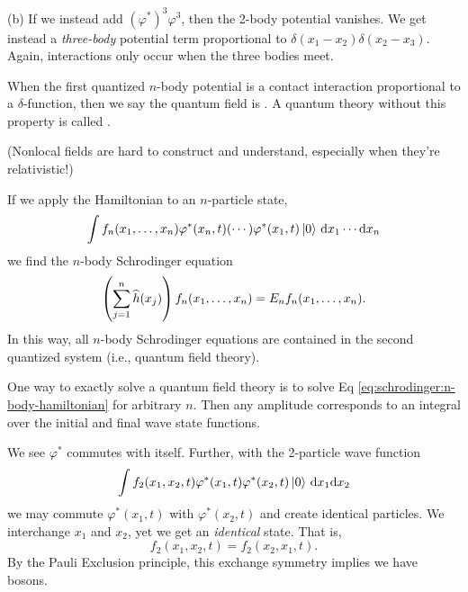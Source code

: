 (b) If we instead add $(\varphi^{*})^{3}\varphi^{3}$, then the 2-body
potential vanishes. We get instead a \emph{three-body} potential term
proportional to $\delta(x_{1}-x_{2})\delta(x_{2}-x_{3})$. Again,
interactions only occur when the three bodies meet.

\begin{definition}
When the first quantized $n$-body potential is a contact
interaction proportional to a $\delta$-function, then we say the quantum
field is . A quantum theory without this property is
called .

(Nonlocal fields are hard to construct and understand, especially when
they're relativistic!)
\end{definition}

If we apply the Hamiltonian to an $n$-particle state,
\begin{equation}
\int f_{n}(x_{1},\dots,x_{n})\varphi^{*}(x_{n},t)(\cdots)\varphi^{*}(x_{1},t)\ket{0}\,\mathrm{d}{x}_{1}
\cdots\mathrm{d}{x}_{n}
\end{equation}
we find the $n$-body Schrodinger equation
\begin{equation}\label{eq:schrodinger:n-body-hamiltonian}
\left(\sum^{n}_{j=1}\widehat{h}(x_{j})\right)f_{n}(x_{1},\dots,x_{n})=E_{n}f_{n}(x_{1},\dots,x_{n}).
\end{equation}
In this way, all $n$-body Schrodinger equations are contained in the
second quantized system (i.e., quantum field theory).

One way to exactly solve a quantum field theory is to solve Eq
\eqref{eq:schrodinger:n-body-hamiltonian} for arbitrary $n$. Then any
amplitude corresponds to an integral over the initial and final wave
state functions. 


We see $\varphi^{*}$ commutes with itself. Further, with the 2-particle
wave function 
\begin{equation*}
\int f_{2}(x_{1}, x_{2}, t)\varphi^{*}(x_{1},t)\varphi^{*}(x_{2},t)\ket{0}\,\mathrm{d}{x_{1}}\mathrm{d}{x_{2}}
\end{equation*}
we may commute $\varphi^{*}(x_{1},t)$ with $\varphi^{*}(x_{2},t)$ and
create identical particles. We interchange $x_{1}$ and $x_{2}$, yet we
get an \emph{identical} state. That is,
\begin{equation}
f_{2}(x_{1},x_{2},t) = f_{2}(x_{2},x_{1},t).
\end{equation}
By the Pauli Exclusion principle, this exchange symmetry implies we have
bosons. 

